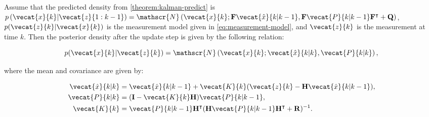 \begin{theorem}
    Assume that the predicted density from \ref{theorem:kalman-predict} is $p\left(\vecat{x}{k} | \vecat{z}{1:k-1}\right)=\allowbreak \mathscr{N}\left(\vecat{x}{k}; \mathbf{F} \vecat{\hat{x}}{k|k-1}, \mathbf{F} \vecat{P}{k|k-1} \mathbf{F}^\intercal + \mathbf{Q}\right)$, $p(\vecat{z}{k} | \vecat{x}{k})$ is the measurement model given in \ref{eq:measurement-model},
    and $\vecat{z}{k}$ is the measurement at time $k$. Then the posterior density after the update step is given by the following relation:

    \begin{equation}
        p(\vecat{x}{k} | \vecat{z}{k}) = 
        \mathscr{N}\left(
            \vecat{x}{k}; \vecat{\hat{x}}{k|k}, \vecat{P}{k|k}
        \right),
    \end{equation}

    where the mean and covariance are given by:

    \begin{align}
        \vecat{\hat{x}}{k|k}
        &= \vecat{\hat{x}}{k|k-1} + \vecat{K}{k}(\vecat{z}{k} - \mathbf{H}\vecat{\hat{x}}{k|k-1}), \\
        \vecat{P}{k|k}
        &= (\mathbf{I} - \vecat{K}{k}\mathbf{H})\vecat{P}{k|k-1}, \\
        \vecat{K}{k} 
        &= \vecat{P}{k|k-1}\mathbf{H}^\intercal(\mathbf{H}\vecat{P}{k|k-1}\mathbf{H}^\intercal + \mathbf{R})^{-1}.
    \end{align}
\end{theorem}

